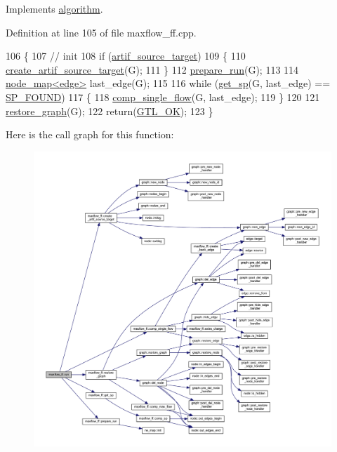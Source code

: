 Implements \mbox{\hyperlink{classalgorithm_a734b189509a8d6b56b65f8ff772d43ca}{algorithm}}.



Definition at line 105 of file maxflow\+\_\+ff.\+cpp.


\begin{DoxyCode}
106 \{
107     \textcolor{comment}{// init}
108     \textcolor{keywordflow}{if} (\mbox{\hyperlink{classmaxflow__ff_a1ec31e7053722875a2e90659f79396a3}{artif\_source\_target}})
109     \{
110     \mbox{\hyperlink{classmaxflow__ff_ad2634e4325012773d793e9cf8f1a3dcf}{create\_artif\_source\_target}}(G);
111     \}
112     \mbox{\hyperlink{classmaxflow__ff_a8ad20b45a7d30070bb65e68758c2f7d3}{prepare\_run}}(G);
113 
114     \mbox{\hyperlink{classnode__map}{node\_map<edge>}} last\_edge(G);
115 
116     \textcolor{keywordflow}{while} (\mbox{\hyperlink{classmaxflow__ff_a532b1285a791d23ab318791bc093fde7}{get\_sp}}(G, last\_edge) == \mbox{\hyperlink{classmaxflow__ff_a08dc6e5c5fe20a9f9d93721f8c273592acf4f271b476cce9871e48ba446283d64}{SP\_FOUND}})
117     \{
118     \mbox{\hyperlink{classmaxflow__ff_a22a432bb072e0410f20bb418dfd4d3a9}{comp\_single\_flow}}(G, last\_edge);
119     \}
120 
121     \mbox{\hyperlink{classmaxflow__ff_a31a13c79918964a49fa18b4eb514c584}{restore\_graph}}(G);
122     \textcolor{keywordflow}{return}(\mbox{\hyperlink{classalgorithm_af1a0078e153aa99c24f9bdf0d97f6710a5114c20e4a96a76b5de9f28bf15e282b}{GTL\_OK}});
123 \}
\end{DoxyCode}
Here is the call graph for this function\+:\nopagebreak
\begin{figure}[H]
\begin{center}
\leavevmode
\includegraphics[width=350pt]{classmaxflow__ff_a0a4391b9093d6966b47c023a555099e2_cgraph}
\end{center}
\end{figure}
\mbox{\label{classmaxflow__ff_ad2485a4c093dbcfa045d1e6e5d78f533}} 

